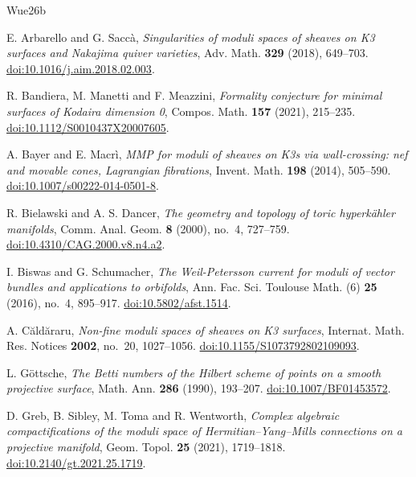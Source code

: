 \begin{thebibliography}{Wue26b}

E. Arbarello and G. Sacc\`a,
\emph{Singularities of moduli spaces of sheaves on K3 surfaces and
Nakajima quiver varieties}, Adv. Math. \textbf{329} (2018), 649--703.
\href{https://doi.org/10.1016/j.aim.2018.02.003}{doi:10.1016/j.aim.2018.02.003}.

R. Bandiera, M. Manetti and F. Meazzini,
\emph{Formality conjecture for minimal surfaces of Kodaira dimension 0},
Compos. Math. \textbf{157} (2021), 215--235.
\href{https://doi.org/10.1112/S0010437X20007605}{doi:10.1112/S0010437X20007605}.

A. Bayer and E. Macr\`i,
\emph{MMP for moduli of sheaves on K3s via wall-crossing: nef and
movable cones, Lagrangian fibrations}, Invent. Math. \textbf{198}
(2014), 505--590.
\href{https://doi.org/10.1007/s00222-014-0501-8}{doi:10.1007/s00222-014-0501-8}.

R. Bielawski and A. S. Dancer,
\emph{The geometry and topology of toric hyperk\"ahler manifolds},
Comm. Anal. Geom. \textbf{8} (2000), no.~4, 727--759.
\href{https://doi.org/10.4310/CAG.2000.v8.n4.a2}{doi:10.4310/CAG.2000.v8.n4.a2}.

I. Biswas and G. Schumacher,
\emph{The Weil-Petersson current for moduli of vector bundles and
applications to orbifolds}, Ann. Fac. Sci. Toulouse Math. (6)
\textbf{25} (2016), no.~4, 895--917.
\href{https://doi.org/10.5802/afst.1514}{doi:10.5802/afst.1514}.

A. C\u{a}ld\u{a}raru,
\emph{Non-fine moduli spaces of sheaves on K3 surfaces},
Internat. Math. Res. Notices \textbf{2002}, no.~20, 1027--1056.
\href{https://doi.org/10.1155/S1073792802109093}{doi:10.1155/S1073792802109093}.

L. G\"ottsche,
\emph{The Betti numbers of the Hilbert scheme of points on a smooth
projective surface}, Math. Ann. \textbf{286} (1990), 193--207.
\href{https://doi.org/10.1007/BF01453572}{doi:10.1007/BF01453572}.

D. Greb, B. Sibley, M. Toma and R. Wentworth,
\emph{Complex algebraic compactifications of the moduli space of
Hermitian--Yang--Mills connections on a projective manifold},
Geom. Topol. \textbf{25} (2021), 1719--1818.
\href{https://doi.org/10.2140/gt.2021.25.1719}{doi:10.2140/gt.2021.25.1719}.


\end{thebibliography}
